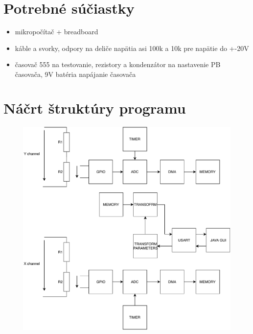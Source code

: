 \documentclass{article}
\begin{document}
	\section{Potrebné súčiastky}
		\begin{itemize}
		\item mikropočítač + breadboard
		\item káble a svorky, odpory na deliče napätia asi 100k a 10k pre napätie do +-20V
		\item časovač 555 na testovanie, rezistory a kondenzátor na nastavenie PB časovača, 9V batéria napájanie časovača
	\end{itemize}
	\section{Náčrt štruktúry programu}
	
	\begin{figure}[!h]
		\centering
		\includegraphics[width=\linewidth]{../Obrazky/basicstructure.pdf}
	\end{figure}
\end{document}
